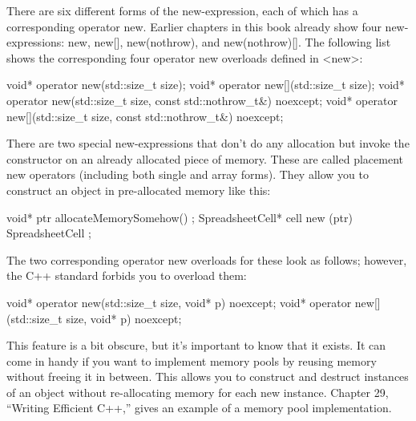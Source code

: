 
There are six different forms of the new-expression, each of which has a corresponding operator new. Earlier chapters in this book already show four new-expressions: new, new[], new(nothrow), and new(nothrow)[]. The following list shows the corresponding four operator new overloads defined in <new>:

\begin{cpp}
void* operator new(std::size_t size);
void* operator new[](std::size_t size);
void* operator new(std::size_t size, const std::nothrow_t&) noexcept;
void* operator new[](std::size_t size, const std::nothrow_t&) noexcept;
\end{cpp}

There are two special new-expressions that don’t do any allocation but invoke the constructor on an already allocated piece of memory. These are called placement new operators (including both single and array forms). They allow you to construct an object in pre-allocated memory like this:

\begin{cpp}
void* ptr { allocateMemorySomehow() };
SpreadsheetCell* cell { new (ptr) SpreadsheetCell {} };
\end{cpp}

The two corresponding operator new overloads for these look as follows; however, the C++ standard forbids you to overload them:

\begin{cpp}
void* operator new(std::size_t size, void* p) noexcept;
void* operator new[](std::size_t size, void* p) noexcept;
\end{cpp}

This feature is a bit obscure, but it’s important to know that it exists. It can come in handy if you want to implement memory pools by reusing memory without freeing it in between. This allows you to construct and destruct instances of an object without re-allocating memory for each new instance. Chapter 29, “Writing Efficient C++,” gives an example of a memory pool implementation.



